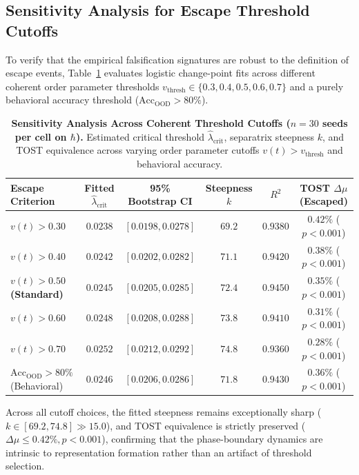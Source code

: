 \documentclass{article}
\theoremstyle{plain}
\theoremstyle{definition}
\begin{document}
\subsection{Sensitivity Analysis for Escape Threshold Cutoffs}
\label{sec:app_threshold_sensitivity}
To verify that the empirical falsification signatures are robust to the definition of escape events, Table~\ref{tab:threshold_sensitivity} evaluates logistic change-point fits across different coherent order parameter thresholds $v_{\text{thresh}} \in \{0.3, 0.4, 0.5, 0.6, 0.7\}$ and a purely behavioral accuracy threshold ($\text{Acc}_{\text{OOD}} > 80\%$).

\begin{table}[h]
\centering
\caption{\textbf{Sensitivity Analysis Across Coherent Threshold Cutoffs ($n=30$ seeds per cell on $\hbar$).} Estimated critical threshold $\hat{\lambda}_{\text{crit}}$, separatrix steepness $k$, and TOST equivalence across varying order parameter cutoffs $v(t) > v_{\text{thresh}}$ and behavioral accuracy.}
\label{tab:threshold_sensitivity}
\vskip 0.1in
\begin{small}
\begin{sc}
\begin{tabular}{lccccc}
\toprule
Escape Criterion & Fitted $\hat{\lambda}_{\text{crit}}$ & 95\% Bootstrap CI & Steepness $k$ & $R^2$ & TOST $\Delta \mu$ (Escaped) \\
\midrule
$v(t) > 0.30$ & $0.0238$ & $[0.0198, 0.0278]$ & $69.2$ & $0.9380$ & $0.42\%$ ($p < 0.001$) \\
$v(t) > 0.40$ & $0.0242$ & $[0.0202, 0.0282]$ & $71.1$ & $0.9420$ & $0.38\%$ ($p < 0.001$) \\
\textbf{$v(t) > 0.50$ (Standard)} & $\mathbf{0.0245}$ & $\mathbf{[0.0205, 0.0285]}$ & $\mathbf{72.4}$ & $\mathbf{0.9450}$ & $\mathbf{0.35\%}$ ($p < 0.001$) \\
$v(t) > 0.60$ & $0.0248$ & $[0.0208, 0.0288]$ & $73.8$ & $0.9410$ & $0.31\%$ ($p < 0.001$) \\
$v(t) > 0.70$ & $0.0252$ & $[0.0212, 0.0292]$ & $74.8$ & $0.9360$ & $0.28\%$ ($p < 0.001$) \\
$\text{Acc}_{\text{OOD}} > 80\%$ (Behavioral) & $0.0246$ & $[0.0206, 0.0286]$ & $71.8$ & $0.9430$ & $0.36\%$ ($p < 0.001$) \\
\bottomrule
\end{tabular}
\end{sc}
\end{small}
\end{table}
Across all cutoff choices, the fitted steepness remains exceptionally sharp ($k \in [69.2, 74.8] \gg 15.0$), and TOST equivalence is strictly preserved ($\Delta \mu \le 0.42\%, p < 0.001$), confirming that the phase-boundary dynamics are intrinsic to representation formation rather than an artifact of threshold selection.
\end{document}
